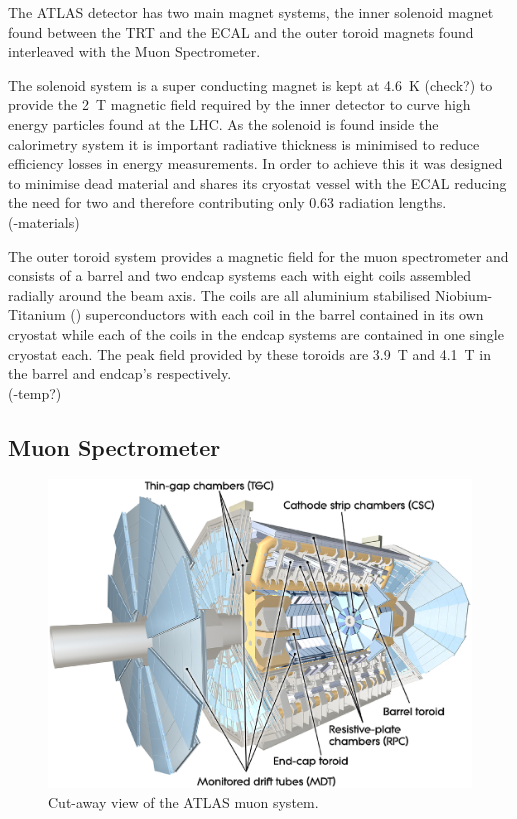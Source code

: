 		The ATLAS detector has two main magnet systems, the inner solenoid magnet found between the TRT and the ECAL and the outer toroid magnets found interleaved with the Muon Spectrometer. 

		The solenoid system is a super conducting magnet is kept at \SI{4.6}{\K} (check?) to provide the \SI{2}{T} magnetic field required by the inner detector to curve high energy particles found at the LHC. As the solenoid is found inside the calorimetry system it is important radiative thickness is minimised to reduce efficiency losses in energy measurements. In order to achieve this it was designed to minimise dead material and shares its cryostat vessel with the ECAL reducing the need for two and therefore contributing only 0.63 radiation lengths.\\ 
		(-materials)

		The outer toroid system provides a magnetic field for the muon spectrometer and consists of a barrel and two endcap systems each with eight coils assembled radially around the beam axis. The coils are all aluminium stabilised Niobium-Titanium () superconductors with each coil in the barrel contained in its own cryostat while each of the coils in the endcap systems are contained in one single cryostat each. The peak field provided by these toroids are \SI{3.9}{T} and \SI{4.1}{T} in the barrel and endcap's respectively.\\
		(-temp?)

	


	\subsection{Muon Spectrometer}

		\begin{figure}[h]
			\begin{center}
				\includegraphics[scale=0.4]{images/MuonSystem_d3.eps}
			\end{center}
			\caption{ Cut-away view of the ATLAS muon system.}
			\label{fig:ATLAS_muon}
		\end{figure}

